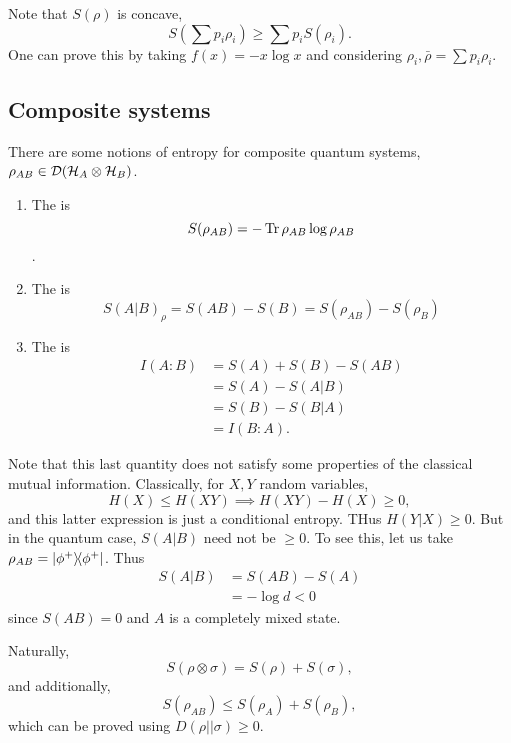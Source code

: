 Note that $S(\rho)$ is concave,
\begin{equation}
    S(\sum p_i \rho_i)\geq \sum p_i S(\rho_i).
\end{equation}
One can prove this by taking $f(x)=-x\log x$ and considering $\rho_i, \bar \rho=\sum p_i \rho_i$.

\subsection*{Composite systems}
There are some notions of entropy for composite quantum systems, $\rho_{AB}\in \mathcal{D}(\mathcal H_A \otimes \mathcal H_B)$.
\begin{enumerate}
    \item The  is 
    \begin{equation}
        S(\rho_{AB})=-\operatorname{Tr} \rho_{AB}\log \rho_{AB}
    \end{equation}.
    \item The  is
    \begin{equation}
        S(A|B)_\rho=S(AB)-S(B) =S(\rho_{AB})-S(\rho_B)
    \end{equation}
    \item The  is
    \begin{align*}
        I(A:B) &=S(A)+S(B)-S(AB)\\
        &=S(A)-S(A|B)\\
        &= S(B)- S(B|A)\\
        &= I(B:A).
    \end{align*}
\end{enumerate}
Note that this last quantity does not satisfy some properties of the classical mutual information. Classically, for $X,Y$ random variables,
\begin{equation}
    H(X) \leq H(XY) \implies H(XY)-H(X) \geq 0,
\end{equation}
and this latter expression is just a conditional entropy. THus $H(Y|X)\geq 0$. But in the quantum case, $S(A|B)$ need not be $\geq 0$. To see this, let us take $\rho_{AB}=\left\lvert{\phi^+}\middle\rangle\!\middle\langle{\phi^+}\right\rvert$. Thus
\begin{align*}
    S(A|B) &= S(AB) - S(A)\\
        &= -\log d <0
\end{align*}
since $S(AB)=0$ and $A$ is a completely mixed state.

Naturally,
\begin{equation}
    S(\rho\otimes \sigma)= S(\rho)+S(\sigma),
\end{equation}
and additionally,
\begin{equation}
    S(\rho_{AB})\leq S(\rho_A) +S(\rho_B),
\end{equation}
which can be proved using $D(\rho||\sigma)\geq 0$.